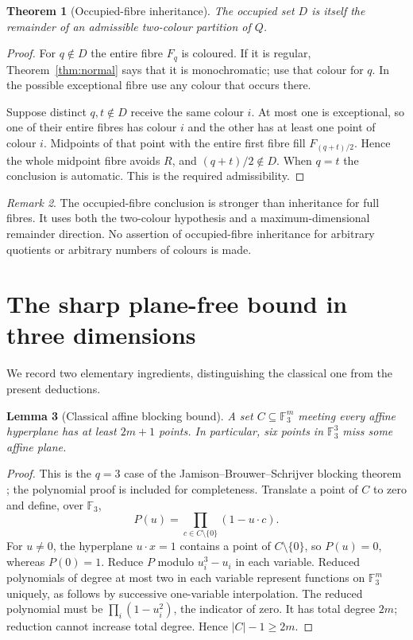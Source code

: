 \documentclass[11pt]{article}
\newtheorem{theorem}{Theorem}[section]
\newtheorem{lemma}[theorem]{Lemma}
\theoremstyle{remark}\newtheorem{remark}[theorem]{Remark}
\newcommand{\F}{\mathbb F_3}
\begin{document}
\begin{theorem}[Occupied-fibre inheritance]\label{thm:occupied}
The occupied set $D$ is itself the remainder of an admissible two-colour
partition of $Q$.
\end{theorem}
\begin{proof}
For $q\notin D$ the entire fibre $F_q$ is coloured. If it is regular,
Theorem~\ref{thm:normal} says that it is monochromatic; use that colour for
$q$. In the possible exceptional fibre use any colour that occurs there.

Suppose distinct $q,t\notin D$ receive the same colour $i$. At most one is
exceptional, so one of their entire fibres has colour $i$ and the other has
at least one point of colour $i$. Midpoints of that point with the entire
first fibre fill $F_{(q+t)/2}$. Hence the whole midpoint fibre avoids $R$,
and $(q+t)/2\notin D$. When $q=t$ the conclusion is automatic. This is the
required admissibility.
\end{proof}

\begin{remark}
The occupied-fibre conclusion is stronger than inheritance for full fibres.
It uses both the two-colour hypothesis and a maximum-dimensional remainder
direction. No assertion of occupied-fibre inheritance for arbitrary
quotients or arbitrary numbers of colours is made.
\end{remark}

\section{The sharp plane-free bound in three dimensions}

We record two elementary ingredients, distinguishing the classical one from
the present deductions.

\begin{lemma}[Classical affine blocking bound]\label{lem:block}
A set $C\subseteq\F^m$ meeting every affine hyperplane has at least $2m+1$
points. In particular, six points in $\F^3$ miss some affine plane.
\end{lemma}
\begin{proof}
This is the $q=3$ case of the Jamison--Brouwer--Schrijver blocking theorem
\cite{jamison,brouwer}; the polynomial proof is included for completeness.
Translate a point of $C$ to zero and define, over $\F$,
\[
 P(u)=\prod_{c\in C\setminus\{0\}}(1-u\cdot c).
\]
For $u\ne0$, the hyperplane $u\cdot x=1$ contains a point of
$C\setminus\{0\}$, so $P(u)=0$, whereas $P(0)=1$. Reduce $P$ modulo
$u_i^3-u_i$ in each variable. Reduced polynomials of degree at most two
in each variable represent functions on $\F^m$ uniquely, as follows by
successive one-variable interpolation. The reduced polynomial must be
$\prod_i(1-u_i^2)$, the indicator of zero. It has total degree $2m$;
reduction cannot increase total degree. Hence $|C|-1\geq2m$.
\end{proof}
\end{document}
